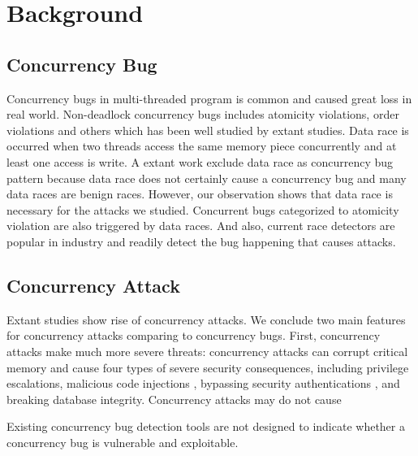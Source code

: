 \section{Background}\label{sec:background}

\subsection{Concurrency Bug}

Concurrency bugs in multi-threaded program is common and caused great loss in real world\cite{}. 
Non-deadlock concurrency bugs includes 
atomicity violations\cite{}, order violations\cite{} and others which has been well studied 
by extant studies\cite{lu:concurrency-bugs,conmem:asplos10}. Data race is occurred when two threads 
access the same memory piece concurrently and at least one access is write.
A extant work exclude data race as concurrency bug pattern 
because data race does not certainly cause a concurrency bug\cite{lu:concurrency-bugs} and many data races are benign races. 
However, our observation shows that data race is necessary for the attacks we studied.  
Concurrent bugs categorized to atomicity violation are also triggered by data races.
And also, current race detectors are popular in industry\cite{tsan,valgrind:pldi} and 
readily detect the bug happening that causes attacks.  

 
\subsection{Concurrency Attack}

Extant studies \cite{con:hotpar12, acidrain:sigmod17} show rise of concurrency 
attacks. We conclude two main features for concurrency attacks comparing to concurrency bugs. 
First, concurrency attacks make much more severe threats:
concurrency attacks can corrupt critical memory and cause four
types of severe security consequences, including privilege escalations\cite{uselib-bug-12791, mysql-bug-24988},
malicious code injections \cite{msiexploit},  
bypassing security authentications\cite{cve-2010-0923, cve-2008-0034, cve-2010-1754}
, and breaking database integrity\cite{acidrain:sigmod17}. 
Concurrency attacks may do not cause 

Existing concurrency bug detection tools are not designed to indicate 
whether a concurrency bug is vulnerable and exploitable.


